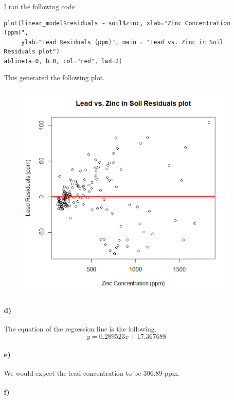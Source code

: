 \documentclass[12pt]{article}
\begin{document}
I ran the following code
\scriptsize
\begin{verbatim}
plot(linear_model$residuals ~ soil$zinc, xlab="Zinc Concentration (ppm)",
     ylab="Lead Residuals (ppm)", main = "Lead vs. Zinc in Soil Residuals plot")
abline(a=0, b=0, col="red", lwd=2)
\end{verbatim}
\normalsize
This generated the following plot.
\begin{figure}[H]
    \begin{center}
        \includegraphics[width=4.5in]{exercise1c.png}
    \end{center}
\end{figure}

\paragraph{d)}

The equation of the regression line is the following.
\[y=0.289523x+17.367688\]

\paragraph{e)}

We would expect the lead concentration to be 306.89 ppm.

\paragraph{f)}
\end{document}
